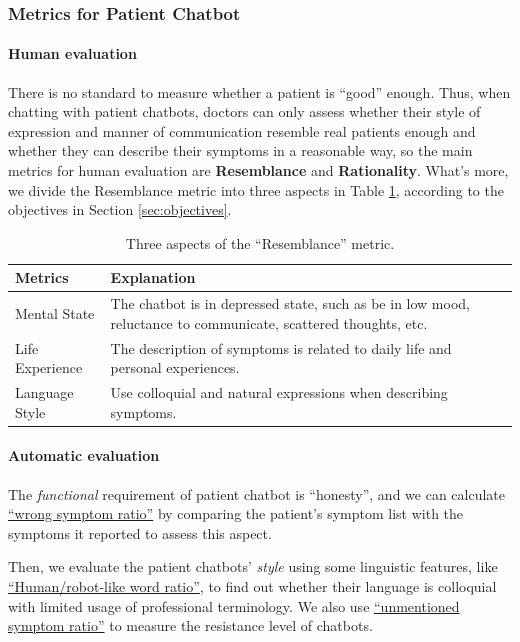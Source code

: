 \subsubsection{Metrics for Patient Chatbot}
\label{sec:pat_metric}
\paragraph{Human evaluation}
There is no standard to measure whether a patient is ``good'' enough. Thus, when chatting with patient chatbots, doctors can only assess whether their style of expression and manner of communication resemble real patients enough and whether they can describe their symptoms in a reasonable way, so the main metrics for human evaluation are \textbf{Resemblance} and \textbf{Rationality}.
What's more, we divide the Resemblance metric into three aspects in Table \ref{tab:human_eval_patient}, according to the objectives in Section \ref{sec:objectives}.

\begin{table}[h]
    \centering
    \footnotesize
    \begin{tabular}{m{}|m{}}
    \hline
    Metrics & Explanation \\
    \hline
    Mental State & The chatbot is in depressed state, such as be in low mood, reluctance to communicate, scattered thoughts, etc.\\
    \hline
    Life Experience & The description of symptoms is related to daily life and personal experiences.\\
    \hline
    Language Style & Use colloquial and natural expressions when describing symptoms.\\
    \hline
    \end{tabular}
    \caption{Three aspects of the ``Resemblance'' metric.}
    \label{tab:human_eval_patient}
\end{table}
\paragraph{Automatic evaluation}
The \textit{functional} requirement of patient chatbot is ``honesty'', and we can calculate \uline{``wrong symptom ratio''} by comparing the patient's symptom list with the symptoms it reported to assess this aspect. 

Then, we evaluate the patient chatbots' \textit{style} using some linguistic features, like \uline{``Human/robot-like word ratio''}, to find out whether their language is colloquial with limited usage of professional terminology. We also use \uline{``unmentioned symptom ratio''} to measure the resistance level of chatbots. 

